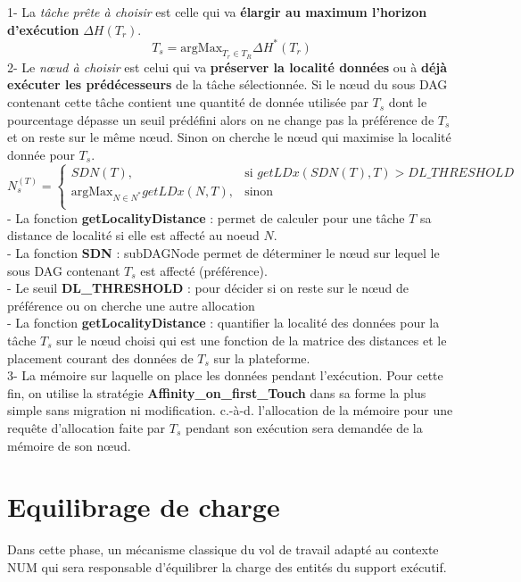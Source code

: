 1- La \textit{tâche prête à choisir} est celle qui va \textbf{élargir au maximum l'horizon d'exécution} $\Delta H(T_r)$.
%
$$
T_s =  \text{argMax}_{T_r \in T_R} \Delta H^*(T_r) 
$$
%
2- Le \textit{nœud à choisir} est celui qui va \textbf{préserver la localité données} ou à \textbf{déjà exécuter les prédécesseurs} de la tâche sélectionnée. Si le nœud du sous DAG contenant cette tâche contient une quantité de donnée utilisée par $T_s$ dont le pourcentage dépasse un seuil prédéfini alors on ne change pas la préférence de $T_s$ et on reste sur le même nœud. Sinon on cherche le nœud qui maximise la localité donnée pour $T_s$.
%
$$
N_s^(T) =
\begin{cases}
SDN(T), & \text{si } getLDx(SDN(T),T) > DL\_THRESHOLD\\
\text{argMax}_{N \in N^*} getLDx(N, T), & \text{sinon}\\
\end{cases}
$$
%
- La fonction \textbf{getLocalityDistance} : permet de calculer pour une tâche $T$ sa distance de localité si elle est affecté au noeud $N$.  \\
- La fonction \textbf{SDN} : subDAGNode permet de déterminer le nœud sur lequel le sous DAG contenant $T_s$ est affecté (préférence).\\
- Le seuil \textbf{DL\_THRESHOLD} : pour décider si on reste sur le nœud de préférence ou on cherche une autre allocation\\
- La fonction \textbf{getLocalityDistance} : quantifier la localité des données pour la tâche $T_s$ sur le nœud choisi qui est une fonction de la matrice des distances et le placement courant des données de $T_s$ sur la plateforme.\\
3- La mémoire sur laquelle on place les données pendant l'exécution. Pour cette fin, on utilise la stratégie \textbf{Affinity\_on\_first\_Touch} dans sa forme la plus simple sans migration ni modification. c.-à-d. l'allocation de la mémoire pour une requête d'allocation faite par $T_s$ pendant son exécution sera demandée de la mémoire de son nœud. %
\section{Equilibrage de charge}\label{EC}
%
Dans cette phase, un mécanisme classique du vol de travail adapté au contexte NUM qui sera responsable d'équilibrer la charge des entités du support exécutif.
%
